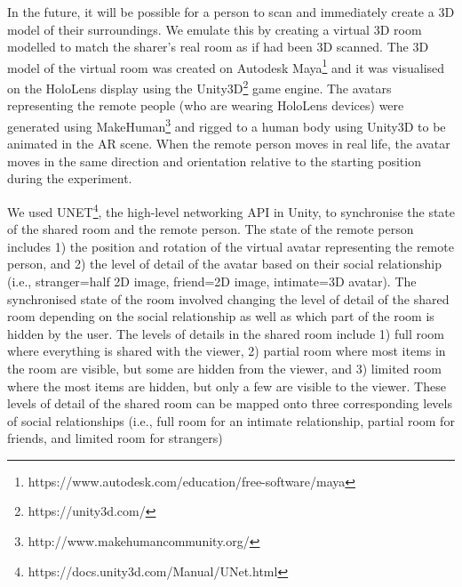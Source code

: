 
In the future, it will be possible for a person to scan and immediately create a 3D model of their surroundings. We emulate this by creating a virtual 3D room modelled to match the sharer's real room as if had been 3D scanned.  The 3D model of the virtual room was created on Autodesk Maya\footnote{https://www.autodesk.com/education/free-software/maya} and it was visualised on the HoloLens display using the Unity3D\footnote{https://unity3d.com/} game engine. The avatars representing the remote people (who are wearing HoloLens devices) were generated using MakeHuman\footnote{http://www.makehumancommunity.org/} and rigged to a human body using Unity3D to be animated in the AR scene. When the remote person moves in real life, the avatar moves in the same direction and orientation relative to the starting position during the experiment. 


We used UNET\footnote{https://docs.unity3d.com/Manual/UNet.html}, the high-level networking API in Unity, to synchronise the state of the shared room and the remote person. The state of the remote person includes 1) the position and rotation of the virtual avatar representing the remote person, and 2) the level of detail of the avatar based on their social relationship (i.e., stranger=half 2D image, friend=2D image, intimate=3D avatar). The synchronised state of the room involved changing the level of detail of the shared room depending on the social relationship as well as which part of the room is hidden by the user. The levels of details in the shared room include 1) full room where everything is shared with the viewer, 2) partial room where most items in the room are visible, but some are hidden from the viewer, and 3) limited room where the most items are hidden, but only a few are visible to the viewer. These levels of detail of the shared room can be mapped onto three corresponding levels of social relationships (i.e., full room for an intimate relationship, partial room for friends, and limited room for strangers)

